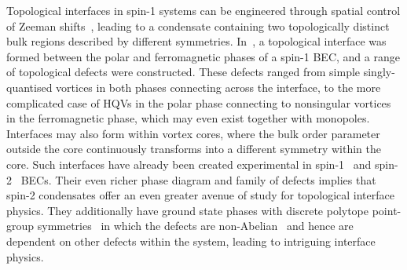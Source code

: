 Topological interfaces in spin-1 systems can be engineered through spatial
control of Zeeman shifts~\cite{Borgh2012, Borgh2013, Borgh2014}, leading to
a condensate containing two topologically distinct bulk regions described by
different symmetries.
In~\cite{Borgh2012}, a topological interface was formed between the polar and
ferromagnetic phases of a spin-1 BEC, and a range of topological defects were
constructed.
These defects ranged from simple singly-quantised vortices in both phases
connecting across the interface, to the more complicated case of HQVs in the
polar phase connecting to nonsingular vortices in the ferromagnetic phase, which
may even exist together with monopoles.
Interfaces may also form within vortex cores, where the bulk order parameter
outside the core continuously transforms into a different symmetry within
the core.
Such interfaces have already been created experimental in
spin-1~\cite{Weiss2019,Xiao2021} and spin-2~\cite{Xiao2022} BECs.
Their even richer phase diagram and family of defects implies that spin-2
condensates offer an even greater avenue of study for topological interface
physics.
They additionally have ground state phases with discrete polytope point-group
symmetries~\cite{Xiao2022,Semenoff2007,Yip2007,Kawaguchi2011} in which the
defects are non-Abelian~\cite{Mermin1979} and hence are dependent on other
defects within the system, leading to intriguing interface physics.

